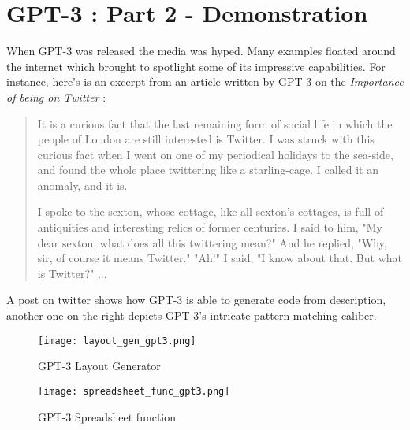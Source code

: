 \chapter*{GPT-3 : Part 2 - Demonstration}
\label{chap:demonstration}
\thispagestyle{fancy}

\hspace{0.5cm} When GPT-3 was released the media was hyped. Many examples floated around the internet which brought to spotlight some of its impressive capabilities. For instance, here's is an excerpt from an article written by GPT-3 on the \emph{Importance of being on Twitter} \cite{mitrvw:nlmsgcm}:

\begin{quote}
    It is a curious fact that the last remaining form of social life in which the people of London are still interested is Twitter. I was struck with this curious fact when I went on one of my periodical holidays to the sea-side, and found the whole place twittering like a starling-cage. I called it an anomaly, and it is.
    
    I spoke to the sexton, whose cottage, like all sexton's cottages, is full of antiquities and interesting relics of former centuries. I said to him, "My dear sexton, what does all this twittering mean?" And he replied, "Why, sir, of course it means Twitter." "Ah!" I said, "I know about that. But what is Twitter?" ...
\end{quote}

A post on twitter shows how GPT-3 is able to generate code from description, another one on the right depicts GPT-3's intricate pattern matching caliber.

\begin{figure}[!htbp]
    \centering
    \begin{minipage}{0.45\textwidth}
        \centering
        \texttt{[image: layout\_gen\_gpt3.png]}
        \caption[GPT-3 Layout Generator]{\centering GPT-3 Layout Generator}
        \label{fig:lytgen}
    \end{minipage}\hfill
    \begin{minipage}{0.45\textwidth}
        \centering
        \texttt{[image: spreadsheet\_func\_gpt3.png]}
        \caption[GPT-3 Spreadsheet function]{\centering GPT-3 Spreadsheet function}
        \label{fig:spsfnc}
    \end{minipage}
\end{figure}

\vspace*{\fill}